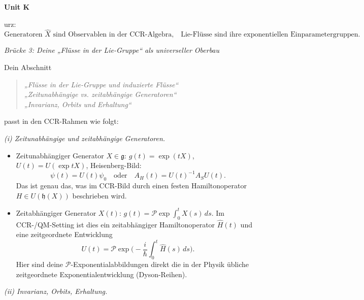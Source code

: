 \documentclass[10pt, letterpaper]{article}
\newenvironment{unit}[1]
  {\begin{unitbox}\textbf{Unit #1}\par\smallskip}
  {\end{unitbox}}
\begin{document}
\begin{unit}
Kurz:
\[
\boxed{
\text{Generatoren } \hat X
\text{ sind Observablen in der CCR-Algebra,}
\quad
\text{Lie-Flüsse sind ihre exponentiellen Einparametergruppen.}
}
\]

\emph{Brücke 3: Deine „Flüsse in der Lie-Gruppe“ als universeller Oberbau}

Dein Abschnitt

\begin{quote}
\emph{„Flüsse in der Lie-Gruppe und induzierte Flüsse“} \\
\emph{„Zeitunabhängige vs. zeitabhängige Generatoren“} \\
\emph{„Invarianz, Orbits und Erhaltung“}
\end{quote}

passt in den CCR-Rahmen wie folgt:

\emph{(i) Zeitunabhängige und zeitabhängige Generatoren.}

\begin{itemize}
  \item Zeitunabhängiger Generator \(X\in\mathfrak g\):  
        \(g(t)=\exp(tX)\), \(U(t)=U(\exp tX)\), Heisenberg-Bild:
        \[
        \psi(t)=U(t)\psi_0
        \quad\text{oder}\quad
        A_H(t)=U(t)^{-1} A_S U(t).
        \]
        Das ist genau das, was im CCR-Bild durch einen festen Hamiltonoperator \(H\in U(\mathfrak{h}(X))\)
        beschrieben wird.
  \item Zeitabhängiger Generator \(X(t)\):  
        \(g(t)=\mathcal{P}\exp\!\int_0^t X(s)\,ds\).
        Im CCR-/QM-Setting ist dies ein zeitabhängiger Hamiltonoperator
        \(\hat H(t)\) und eine zeitgeordnete Entwicklung
        \[
          U(t)=\mathcal{P}\exp\!\Big(-\frac{i}{\hbar}\int_0^t\hat H(s)\,ds\Big).
        \]
        Hier sind deine \(\mathcal{P}\)-Exponentialabbildungen direkt die
        in der Physik übliche zeitgeordnete Exponentialentwicklung (Dyson-Reihen).
\end{itemize}

\emph{(ii) Invarianz, Orbits, Erhaltung.}


\end{unit}
\end{document}
